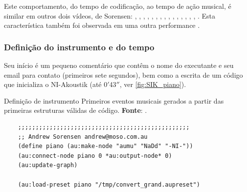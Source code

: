 Este comportamento, do tempo de codificação, ao tempo de ação musical, é similar em outros dois vídeos, de Sorensen: , , , , , ,  , , , , , ,  , , , . Esta característica também foi observada em uma outra performance .

\subsubsection*{Definição do instrumento e do tempo}

Seu início é um pequeno comentário que contêm o nome do executante e seu email para contato (primeiros sete segundos), bem como a escrita de um código que inicializa o NI-Akoustik (até 0$'$43$''$, ver \autoref{fig:SIK_piano}). 

\begin{example}{Definição de instrumento}
  \centering 
Primeiros eventos musicais gerados a partir das primeiras estruturas válidas de código. \textbf{Fonte}: \cite{sorensen_youtube_2014}.
  \begin{verbatim}
    ;;;;;;;;;;;;;;;;;;;;;;;;;;;;;;;;;;;;;;;;;;;;;;;;;
    ;; Andrew Sorensen andrew@moso.com.au
    (define piano (au:make-node "aumu" "NaDd" "-NI-"))
    (au:connect-node piano 0 *au:output-node* 0)
    (au:update-graph)

    (au:load-preset piano "/tmp/convert_grand.aupreset")
  \end{verbatim}
  \label{fig:SIK_piano}
\end{example}

\newcommand{\tempo}[2]{#1$'$#2$''$}

